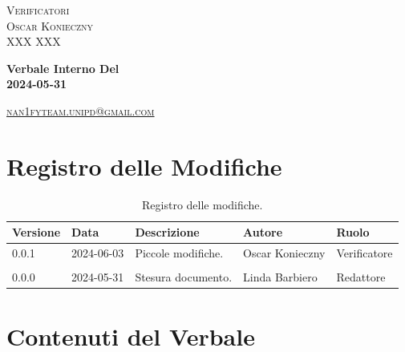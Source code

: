 \documentclass[8pt]{article}
\begin{document}
\begin{titlepage}
\begin{minipage}[t]{0.47\textwidth}
		{\large{\textsc{Verificatori}}
			\vspace{3mm}
			{\\\large{\textsc{Oscar Konieczny}\\}} %
			{\large{\textsc{XXX XXX}}}
			
		}
		\vspace{4mm}\vspace{4mm}
	\end{minipage}
	\vspace{4cm}
	\begin{center}
		\begin{flushright}
			{\fontsize{30pt}{52pt}\selectfont \textbf{Verbale Interno Del\\2024-05-31\\}} %
		\end{flushright}
		\vspace{3cm}
	\end{center}
	\vspace{8.2cm}
	{\small \textsc{\href{mailto: nan1fyteam.unipd@gmail.com}{nan1fyteam.unipd@gmail.com}}}
\end{titlepage}
\pagestyle{mystyle}
\section*{Registro delle Modifiche}
\begin{table}[ht!]	
	\centering
	\begin{tabular}{p{1.2cm} p{2cm} p{6cm} p{3cm} p{2cm}}
		\toprule
		\textbf{Versione}& \textbf{Data} & \textbf{Descrizione} & \textbf{Autore} & \textbf{Ruolo} \\
		\midrule
		0.0.1 & 2024-06-03 & Piccole modifiche. & Oscar Konieczny & Verificatore \\\\
		0.0.0 & 2024-05-31 & Stesura documento. & Linda Barbiero & Redattore \\
		\bottomrule
	\end{tabular}
	\caption{Registro delle modifiche.}
	\label{table:Registro delle modifiche}
\end{table}
\newpage
\tableofcontents
\clearpage
\newpage
\justifying
\section{Contenuti del Verbale}
\end{document}
